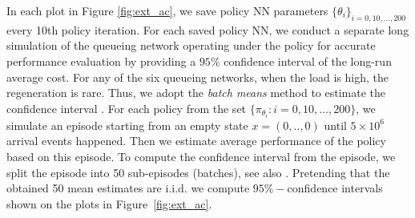 \documentclass[11pt]{article}
\newtheorem{remark}{Remark}
\theoremstyle{definition}
\numberwithin{equation}{section}
\begin{document}


In  each plot in  Figure \ref{fig:ext_ac}, we save policy NN
parameters $\{\theta_i\}_{i=0, 10, ..., 200}$ every 10th policy
iteration.   For each saved policy NN, we conduct a separate long
simulation of the queueing network operating under the policy for accurate performance evaluation by providing a $95\%$
confidence interval of the long-run average cost.   For any of the six queueing networks, when the
load is high, the regeneration is rare.  Thus, we adopt the \textit{
  batch means} method to estimate the confidence interval
\cite[Section 6]{Henderson1997}.  For each policy from the set
$\{ \pi_{\theta_i}: i = 0, 10, ..., 200 \}$, we simulate an episode
starting from an empty state $x = (0,..,0)$ until $5\times10^6$
arrival events happened.  Then we estimate average performance of the
policy based on this episode. To compute the confidence interval from
the episode, we split the episode into 50 sub-episodes (batches), see
also \cite{Nelson1989}. Pretending that the obtained 50 mean estimates
are i.i.d. we compute $95\%-$confidence intervals shown on the plots
in Figure~\ref{fig:ext_ac}.
\end{document}
